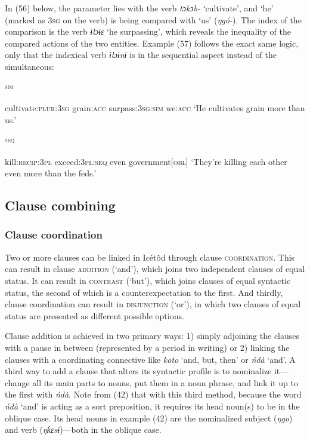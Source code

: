 In (56) below, the parameter lies with the verb \textit{tɔkɔb-} ‘cultivate’, and ‘he’ (marked as 3\textsc{sg} on the verb) is being compared with ‘us’ (\textit{ŋgó-}). The index of the comparison is the verb \textit{ɨlɔɨɛ} ‘he surpassing’, which reveals the inequality of the compared actions of the two entities. Example (57) follows the exact same logic, only that the indexical verb \textit{ɨlɔɨnɨ} is in the sequential aspect instead of the simultaneous: 



\ea\label{ex:}
\textsc{\textsubscript{sim}} \\
    \\
cultivate:\textsc{plur:3sg} grain:\textsc{acc} surpass:\textsc{3sg:sim} we:\textsc{acc}
\glt ‘He cultivates grain more than us.’ 
\z




\ea\label{ex:}
\textsc{\textsubscript{seq}} \\
    \\
kill:\textsc{recip:3pl} exceed:\textsc{3pl:seq} even government[\textsc{obl}]
\glt ‘They’re killing each other even more than the feds.’ 
\z






\subsection{Clause combining}
\subsubsection{Clause coordination}

Two or more clauses can be linked in Icétôd through clause \textsc{coordination}. This can result in clause \textsc{addition} (‘and’), which joins two independent clauses of equal status. It can result in \textsc{contrast} (‘but’), which joins clauses of equal syntactic status, the second of which is a counterexpectation to the first. And thirdly, clause coordination can result in \textsc{disjunction} (‘or’), in which two clauses of equal status are presented as different possible options.

Clause addition is achieved in two primary ways: 1) simply adjoining the clauses with a pause in between (represented by a period in writing) or 2) linking the clauses with a coordinating connective like \textit{koto} ‘and, but, then’ or \textit{ńdà} ‘and’. A third way to add a clause that alters its syntactic profile is to nominalize it—change all its main parts to nouns, put them in a noun phrase, and link it up to the first with \textit{ńdà}. Note from (42) that with this third method, because the word \textit{ńdà} ‘and’ is acting as a sort preposition, it requires its head noun(s) to be in the oblique case. Its head nouns in example (42) are the nominalized subject (\textit{ŋgo}) and verb (\textit{ŋƙɛsɨ})—both in the oblique case.

